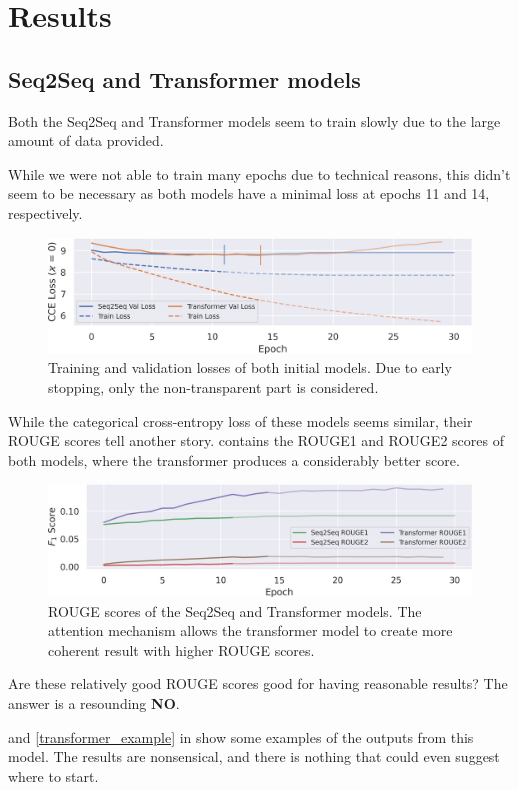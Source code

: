 \section{Results}

\subsection{Seq2Seq and Transformer models}
Both the Seq2Seq and Transformer models seem to train slowly due to the large amount of data provided.

While we were not able to train many epochs due to technical reasons, this didn't seem to be necessary as both models have a minimal loss at epochs 11 and 14, respectively.

\begin{figure}[h]
	\includegraphics[width = \textwidth]{baseline_losses.png}
	\caption{Training and validation losses of both initial models. Due to early stopping, only the non-transparent part is considered.}
\end{figure}

While the categorical cross-entropy loss of these models seems similar, their ROUGE scores tell another story.
 contains the ROUGE1 and ROUGE2 scores of both models, where the transformer produces a considerably better score.

\begin{figure}[h]
	\includegraphics[width = \textwidth]{baseline_rouges.png}
	\caption{ROUGE scores of the Seq2Seq and Transformer models. The attention mechanism allows the transformer model to create more coherent result with higher ROUGE scores.}
	\label{baseline_rouges}
\end{figure}

Are these relatively good ROUGE scores good for having reasonable results?
The answer is a resounding \textbf{NO}.

 and \cref{transformer_example} in \appendixA show some examples of the outputs from this model.
The results are nonsensical, and there is nothing that could even suggest where to start.
